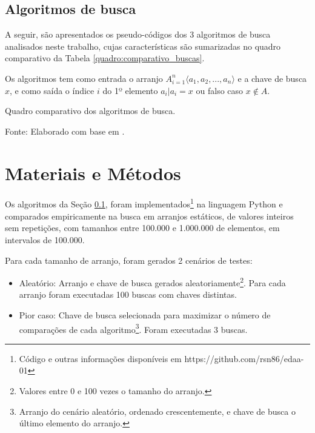 \documentclass[12pt]{article}
\begin{document}
\subsection{Algoritmos de busca} \label{sec:algoritmos}

A seguir, são apresentados os pseudo-códigos dos 3 algoritmos de busca analisados neste trabalho, cujas características são sumarizadas no quadro comparativo da Tabela \ref{quadro:comparativo_buscas}.

Os algoritmos tem como entrada o arranjo $ A^n_{i=1} \langle a_{1}, a_{2}, ..., a_{n} \rangle $ e a chave de busca $ x $, e como saída o índice $ i $ do 1º elemento $ a_{i} \vert a_{i} = x $ ou falso caso $ x \notin A $.





\begin{table}[h]
    \centering
    \resizebox{\textwidth}{!}{
        
    }
    \caption{Quadro comparativo dos algoritmos de busca.}
    \small{Fonte: Elaborado com base em \cite{sultana_brief_2017}.}
    \label{quadro:comparativo_buscas}
\end{table}

\section{Materiais e Métodos}

Os algoritmos da Seção \ref{sec:algoritmos}, foram implementados\footnote{Código e outras informações disponíveis em https://github.com/rsn86/edaa-01} na linguagem Python e comparados empiricamente na busca em arranjos estáticos, de valores inteiros sem repetições, com tamanhos entre 100.000 e 1.000.000 de elementos, em intervalos de 100.000.

Para cada tamanho de arranjo, foram gerados 2 cenários de testes:
\begin{itemize}
    \item Aleatório: Arranjo e chave de busca gerados aleatoriamente\footnote{Valores entre 0 e 100 vezes o tamanho do arranjo.}. Para cada arranjo foram executadas 100 buscas com chaves distintas.
    \item Pior caso: Chave de busca selecionada para maximizar o número de comparações de cada algoritmo\footnote{Arranjo do cenário aleatório, ordenado crescentemente, e chave de busca o último elemento do arranjo.}. Foram executadas 3 buscas.
\end{itemize}
\end{document}
